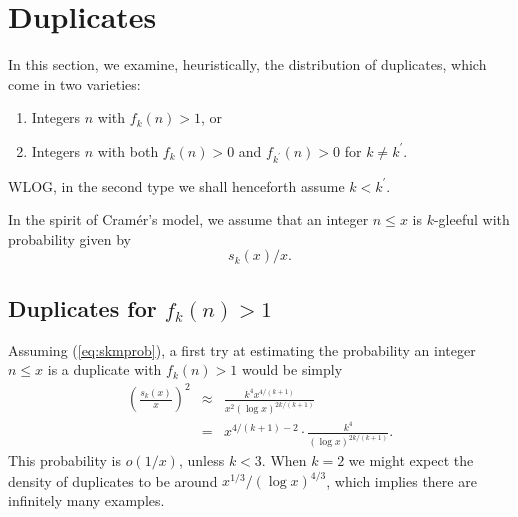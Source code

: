 \documentclass[11pt]{amsart}
\newcommand{\sk}{s_k}
\numberwithin{equation}{section}
\numberwithin{algorithm}{section}
\begin{document}
  






\section{Duplicates}\label{sec:dups}
%

In this section, we examine, heuristically, the distribution of duplicates, which come in two varieties:
  \begin{enumerate}
      \item Integers $n$ with $f_k(n)>1$, or
      \item Integers $n$ with both $f_k(n)>0$ and $f_{k^\prime}(n)>0$ for $k\ne k^\prime$.
  \end{enumerate}
WLOG, in the second type we shall henceforth assume $k<k^\prime$.

In the spirit of Cram\'er's model, we assume that
 an integer $n\le x$ is $k$-gleeful with probability
given by 
\begin{equation}
  \sk(x)/x.  \label{eq:skmprob}
\end{equation}

\subsection{Duplicates for $f_k(n)>1$}

Assuming (\ref{eq:skmprob}), a first try at estimating
the probability an integer $n\le x$ is a duplicate with
$f_k(n)>1$ would be simply
\begin{eqnarray*}
    \left( \frac{\sk(x)}{x} \right)^2
    & \approx &
      \frac{ k^4 x^{4/(k+1)}}{x^2 (\log x)^{2k/(k+1)}} \\
    & = &   x^{ 4/(k+1)-2} \cdot \frac{ k^4 }{ (\log x)^{2k/(k+1)}}.
\end{eqnarray*}
This probability is $o(1/x)$, unless $k<3$.
When $k=2$ we might expect the density of duplicates to be
  around $x^{1/3}/(\log x)^{4/3}$, which implies there
  are infinitely many examples.
\end{document}
